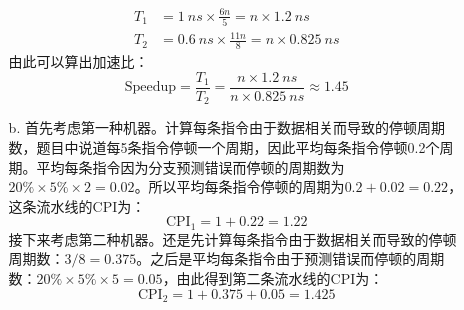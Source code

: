 \documentclass[UTF8,zihao=-4]{ctexart}
\begin{document}
\begin{enumerate}
\begin{enumerate}
			\begin{align*}
				T_1&=\SI{1}{ns}\times \frac{6n}{5}=n\times \SI{1.2}{ns} \\
				T_2&=\SI{0.6}{ns}\times \frac{11n}{8}=n\times \SI{0.825}{ns}
			\end{align*}
			由此可以算出加速比：
			\begin{equation*}
				\text{Speedup}=\frac{T_1}{T_2}=\frac{n\times \SI{1.2}{ns}}{n\times \SI{0.825}{ns}}\approx 1.45
			\end{equation*}
			\item[b.] 首先考虑第一种机器。计算每条指令由于数据相关而导致的停顿周期数，题目中说道每5条指令停顿一个周期，因此平均每条指令停顿0.2个周期。平均每条指令因为分支预测错误而停顿的周期数为$20\% \times 5\% \times 2=0.02$。所以平均每条指令停顿的周期为$0.2+0.02=0.22$，这条流水线的CPI为：
			\begin{equation*}
				\text{CPI}_1=1+0.22=1.22
			\end{equation*}
			接下来考虑第二种机器。还是先计算每条指令由于数据相关而导致的停顿周期数：$3/8=0.375$。之后是平均每条指令由于预测错误而停顿的周期数：$20\% \times 5\% \times 5=0.05$，由此得到第二条流水线的CPI为：
			\begin{equation*}
				\text{CPI}_2=1+0.375+0.05=1.425
			\end{equation*}
		\end{enumerate}
	\end{enumerate}
\end{document}
